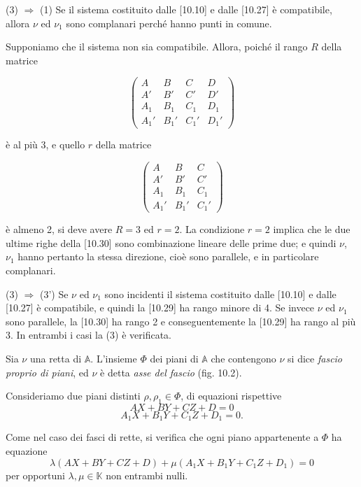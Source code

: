 \documentclass{article}
\theoremstyle{plain}
\theoremstyle{definition}
\theoremstyle{remark}
\begin{document}
(3) $\Rightarrow$ (1) \quad Se il sistema costituito dalle [10.10] e dalle [10.27] è compatibile, allora $\nu$ ed $\nu_1$ sono complanari perché hanno punti in comune.

Supponiamo che il sistema non sia compatibile. Allora, poiché il rango $R$ della matrice

\begin{equation}
\begin{pmatrix}
A & B & C & D \\
A' & B' & C' & D' \\
A_1 & B_1 & C_1 & D_1 \\
A_1' & B_1' & C_1' & D_1'
\end{pmatrix}
\tag{10.29}
\end{equation}

è al più 3, e quello $r$ della matrice

\begin{equation}
\begin{pmatrix}
A & B & C \\
A' & B' & C' \\
A_1 & B_1 & C_1 \\
A_1' & B_1' & C_1'
\end{pmatrix}
\tag{10.30}
\end{equation}

è almeno 2, si deve avere $R = 3$ ed $r = 2$. La condizione $r = 2$ implica che le due ultime righe della [10.30] sono combinazione lineare delle prime due; e quindi $\nu$, $\nu_1$ hanno pertanto la stessa direzione, cioè sono parallele, e in particolare complanari.

(3) $\Rightarrow$ (3') \quad Se $\nu$ ed $\nu_1$ sono incidenti il sistema costituito dalle [10.10] e dalle [10.27] è compatibile, e quindi la [10.29] ha rango minore di 4. Se invece $\nu$ ed $\nu_1$ sono parallele, la [10.30] ha rango 2 e conseguentemente la [10.29] ha rango al più 3. In entrambi i casi la (3) è verificata.

Sia $\nu$ una retta di $\mathbb{A}$. L'insieme $\Phi$ dei piani di $\mathbb{A}$ che contengono $\nu$ si dice \textit{fascio proprio di piani}, ed $\nu$ è detta \textit{asse del fascio} (fig. 10.2).

Consideriamo due piani distinti $\rho, \rho_1 \in \Phi$, di equazioni rispettive
\[
AX + BY + CZ + D = 0
\]
\[
A_1 X + B_1 Y + C_1 Z + D_1 = 0.
\]

Come nel caso dei fasci di rette, si verifica che ogni piano appartenente a $\Phi$ ha equazione
\[
\lambda(AX + BY + CZ + D) + \mu(A_1 X + B_1 Y + C_1 Z + D_1) = 0
\]
per opportuni $\lambda, \mu \in \mathbb{K}$ non entrambi nulli.
\end{document}
